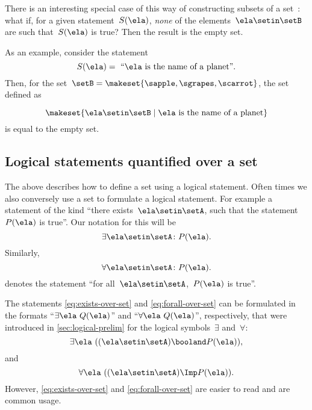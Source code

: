 There is an interesting special case of this way of constructing subsets of a set~\setB:
what if, for a given statement~$S(\ela)$, \emph{none} of the elements~$\ela \setin\setB$ are such that~$S(\ela)$ is true?
Then the result is the empty set.

As an example, consider the statement
%
\begin{equation}
    S(\ela) =\text{ ``} \ela \text{ is the name of a planet''}.
\end{equation}
%
Then, for the set~$\setB = \makeset{ \sapple, \sgrapes, \scarrot }$, the set defined as

\begin{equation}
    \makeset{ \ela \setin\setB \mid \ela \text{ is the name of a planet} }
\end{equation}
is equal to the empty set.

\subsection{Logical statements quantified over a set}

The above describes how to define a set using a logical statement.
Often times we also conversely use a set to formulate a logical statement.
For example a statement of the kind ``there exists~$\ela \setin \setA$, such that the statement~$P(\ela)$ is true''.
Our notation for this will be
%
\begin{equation}
    \label{eq:exists-over-set}
    \exists \ela \setin \setA \colon P(\ela).
\end{equation}
%
Similarly,
\begin{equation}
    \label{eq:forall-over-set}
    \forall \ela \setin \setA \colon P(\ela).
\end{equation}
denotes the statement ``for all~$\ela \setin \setA$,~$P(\ela)$ is true''.

\begin{remark}
    The statements \cref{eq:exists-over-set} and \cref{eq:forall-over-set} can be formulated in the formats ``$\exists \ela \ Q(\ela)$'' and ``$\forall \ela \ Q(\ela)$'', respectively, that were introduced in \cref{sec:logical-prelim} for the logical symbols~$\exists$ and~$\forall$:
    \begin{equation}
        \exists \ela \  ((\ela \setin \setA) \booland P(\ela)),
    \end{equation}
    and
    \begin{equation}
        \forall \ela\  ((\ela\setin \setA) \Imp P(\ela)).
    \end{equation}
    However, \cref{eq:exists-over-set} and \cref{eq:forall-over-set} are easier to read and are common usage.
\end{remark}

